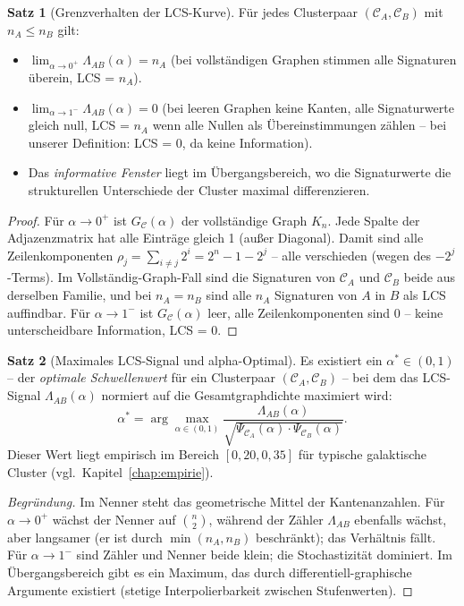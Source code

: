 ﻿\documentclass[a4paper,12pt]{report}
\theoremstyle{definition}
\newtheorem{satz}{Satz}
\begin{document}
\begin{satz}[Grenzverhalten der LCS-Kurve]
\label{satz:grenzverhalten}
Für jedes Clusterpaar $(\mathcal{C}_A, \mathcal{C}_B)$ mit $n_A \leq n_B$ gilt:
\begin{itemize}
    \item $\lim_{\alpha \to 0^+} \Lambda_{AB}(\alpha) = n_A$ (bei vollständigen Graphen stimmen alle Signaturen überein, LCS = $n_A$).
    \item $\lim_{\alpha \to 1^-} \Lambda_{AB}(\alpha) = 0$ (bei leeren Graphen keine Kanten, alle Signaturwerte gleich null, LCS = $n_A$ wenn alle Nullen als Übereinstimmungen zählen -- bei unserer Definition: LCS = 0, da keine Information).
    \item Das \emph{informative Fenster} liegt im Übergangsbereich, wo die Signaturwerte die strukturellen Unterschiede der Cluster maximal differenzieren.
\end{itemize}
\end{satz}

\begin{proof}
Für $\alpha \to 0^+$ ist $G_\mathcal{C}(\alpha)$ der vollständige Graph $K_n$. Jede Spalte der Adjazenzmatrix hat alle Einträge gleich 1 (außer Diagonal). Damit sind alle Zeilenkomponenten $\rho_j = \sum_{i \neq j} 2^i = 2^n - 1 - 2^j$ -- alle verschieden (wegen des $-2^j$-Terms). Im Vollständig-Graph-Fall sind die Signaturen von $\mathcal{C}_A$ und $\mathcal{C}_B$ beide aus derselben Familie, und bei $n_A = n_B$ sind alle $n_A$ Signaturen von $A$ in $B$ als LCS auffindbar. Für $\alpha \to 1^-$ ist $G_\mathcal{C}(\alpha)$ leer, alle Zeilenkomponenten sind 0 -- keine unterscheidbare Information, LCS = 0.
\end{proof}

\begin{satz}[Maximales LCS-Signal und alpha-Optimal]
\label{satz:alpha_opt}
Es existiert ein $\alpha^* \in (0,1)$ -- der \emph{optimale Schwellenwert} für ein Clusterpaar $(\mathcal{C}_A, \mathcal{C}_B)$ -- bei dem das LCS-Signal $\Lambda_{AB}(\alpha)$ normiert auf die Gesamtgraphdichte maximiert wird:
\[
\alpha^* = \arg\max_{\alpha \in (0,1)} \frac{\Lambda_{AB}(\alpha)}{\sqrt{\Psi_{\mathcal{C}_A}(\alpha) \cdot \Psi_{\mathcal{C}_B}(\alpha)}}.
\]
Dieser Wert liegt empirisch im Bereich $[0{,}20, 0{,}35]$ für typische galaktische Cluster (vgl.\ Kapitel~\ref{chap:empirie}).
\end{satz}

\begin{proof}[Begründung]
Im Nenner steht das geometrische Mittel der Kantenanzahlen. Für $\alpha \to 0^+$ wächst der Nenner auf $\binom{n}{2}$, während der Zähler $\Lambda_{AB}$ ebenfalls wächst, aber langsamer (er ist durch $\min(n_A, n_B)$ beschränkt); das Verhältnis fällt. Für $\alpha \to 1^-$ sind Zähler und Nenner beide klein; die Stochastizität dominiert. Im Übergangsbereich gibt es ein Maximum, das durch differentiell-graphische Argumente existiert (stetige Interpolierbarkeit zwischen Stufenwerten).
\end{proof}
\end{document}
